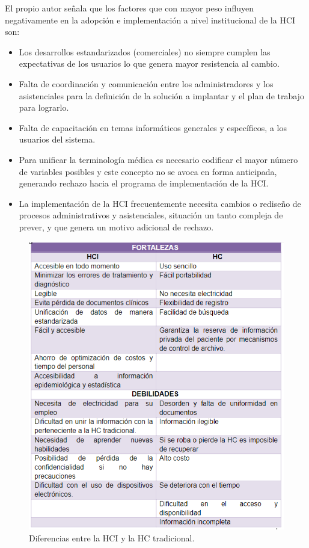 El propio autor señala que los factores que con mayor peso influyen negativamente en la adopción e implementación a nivel institucional de la HCI son:  

\begin{itemize}
\item	Los desarrollos estandarizados (comerciales) no siempre cumplen las expectativas de los usuarios lo que genera mayor resistencia al cambio.  
	
	\item Falta de coordinación y comunicación entre los administradores y los asistenciales para la definición de la solución a implantar y el plan de trabajo para lograrlo.  
	
	\item Falta de capacitación en temas informáticos generales y específicos, a los usuarios del sistema. 
	
	\item Para unificar la terminología médica es necesario codificar el mayor número de variables posibles y este concepto no se avoca en forma anticipada, generando rechazo hacia el programa de implementación de la HCI. 
	
	\item La implementación de la HCI frecuentemente necesita cambios o rediseño de procesos administrativos y asistenciales, situación un tanto compleja de prever, y que genera un motivo adicional de rechazo.  
\end{itemize}
\begin{center}
	\begin{figure}
		\caption{Diferencias entre la HCI y la HC tradicional. }
		\label{HCIvsHC}
		\includegraphics[]{MainMatter/HCIvsHC.PNG}
		
		
	\end{figure}
	
\end{center}

